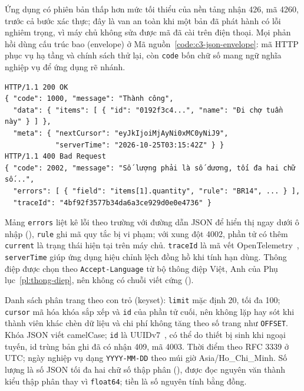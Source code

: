 Ứng dụng có phiên bản thấp hơn mức tối thiểu của nền tảng nhận 426, mã 4260, trước cả bước xác thực; đây là van an toàn khi một bản đã phát hành có lỗi nghiêm trọng, vì máy chủ không sửa được mã đã cài trên điện thoại. Mọi phản hồi dùng cấu trúc bao (envelope) ở Mã nguồn~\ref{code:c3-json-envelope}: mã HTTP phục vụ hạ tầng và chính sách thử lại, còn \texttt{code} bốn chữ số mang ngữ nghĩa nghiệp vụ để ứng dụng rẽ nhánh.

\apiNeed{3.4cm}
\begin{Verbatim}[fontsize=\scriptsize]
HTTP/1.1 200 OK
{ "code": 1000, "message": "Thành công",
  "data": { "items": [ { "id": "0192f3c4...", "name": "Đi chợ tuần này" } ] },
  "meta": { "nextCursor": "eyJkIjoiMjAyNi0xMC0yNiJ9",
            "serverTime": "2026-10-25T03:15:42Z" } }
HTTP/1.1 400 Bad Request
{ "code": 2002, "message": "Số lượng phải là số dương, tối đa hai chữ số...",
  "errors": [ { "field": "items[1].quantity", "rule": "BR14", ... } ],
  "traceId": "4bf92f3577b34da6a3ce929d0e0e4736" }
\end{Verbatim}

Mảng \texttt{errors} liệt kê lỗi theo trường với đường dẫn JSON để hiển thị ngay dưới ô nhập (), \texttt{rule} ghi mã quy tắc bị vi phạm; với xung đột 4002, phần tử có thêm \texttt{current} là trạng thái hiện tại trên máy chủ. \texttt{traceId} là mã vết OpenTelemetry~\cite{opentelemetry}, \texttt{serverTime} giúp ứng dụng hiệu chỉnh lệch đồng hồ khi tính hạn dùng. Thông điệp được chọn theo \texttt{Accept-Language} từ bộ thông điệp Việt, Anh của Phụ lục~\ref{pl:thong-diep}, nên không có chuỗi viết cứng ().

Danh sách phân trang theo con trỏ (keyset): \texttt{limit} mặc định 20, tối đa 100; \texttt{cursor} mã hóa khóa sắp xếp và \texttt{id} của phần tử cuối, nên không lặp hay sót khi thành viên khác chèn dữ liệu và chi phí không tăng theo số trang như \texttt{OFFSET}. Khóa JSON viết camelCase; \texttt{id} là UUIDv7~\cite{rfc9562}, có thể do thiết bị sinh khi ngoại tuyến, id trùng bản ghi đã có nhận 409, mã 4003. Thời điểm theo RFC 3339 ở UTC; ngày nghiệp vụ dạng \texttt{YYYY-MM-DD} theo múi giờ Asia/Ho\_Chi\_Minh. Số lượng là số JSON tối đa hai chữ số thập phân (), được đọc nguyên văn thành kiểu thập phân thay vì \texttt{float64}; tiền là số nguyên tính bằng đồng.

